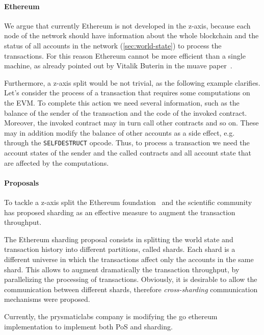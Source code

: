 \paragraph{Ethereum} We argue that currently Ethereum is not developed in the
z-axis, because each node of the network should have information about the whole
blockchain and the status of all accounts in the network 
(\autoref{sec:world-state}) to process the transactions. For this reason 
Ethereum cannot be more efficient than a single machine, as already pointed out 
by Vitalik Buterin in the muave paper~\cite{bib:mauve}.

Furthermore, a z-axis split would be not trivial, as the following example 
clarifies. Let's consider the process of a transaction that requires some 
computations on the EVM. To complete this action we need several information, 
such as the balance of the sender of the transaction and the code of the
invoked contract. Moreover, the invoked contract may in turn call other 
contracts and so on. These may in addition modify the balance of other accounts
as a side effect, e.g. through the \texttt{SELFDESTRUCT} opcode. Thus, to 
process a transaction we need the account states of the sender and the called
contracts and all account state that are affected by the computations.

\paragraph{Proposals} To tackle a z-axis split the Ethereum 
foundation~\cite{bib:mauve} and the scientific 
community~\cite{bib:scaling-croman} has proposed sharding as an effective 
measure to augment the transaction throughput.

The Ethereum sharding proposal consists in splitting the world state and
transaction history into different partitions, called shards. 
Each shard is a different universe in which the transactions affect only the 
accounts in the same shard. This allows to augment dramatically the transaction
throughput, by parallelizing the processing of transactions.
Obviously, it is desirable to allow the communication between different shards,
therefore \emph{cross-sharding} communication mechanisms were proposed.

Currently, the prysmaticlabs company is modifying the go ethereum implementation
to implement both PoS and sharding.




